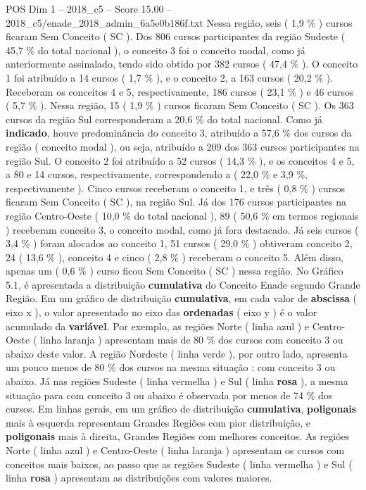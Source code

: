 \begin{textsample}{POS Dim 1 – 2018\_c5 – Score 15.00 – 2018\_c5/enade\_2018\_admin\_6a5e0b186f.txt}
Nessa região, seis ( 1,9 \% ) cursos ficaram Sem Conceito ( SC ).
Dos 806 cursos participantes da região Sudeste ( 45,7 \% do total nacional ), o conceito 3 foi o conceito modal, como já anteriormente assinalado, tendo sido obtido por 382 cursos ( 47,4 \% ).
O conceito 1 foi atribuído a 14 cursos ( 1,7 \% ), e o conceito 2, a 163 cursos ( 20,2 \% ).
Receberam os conceitos 4 e 5, respectivamente, 186 cursos ( 23,1 \% ) e 46 cursos ( 5,7 \% ).
Nessa região, 15 ( 1,9 \% ) cursos ficaram Sem Conceito ( SC ).
Os 363 cursos da região Sul corresponderam a 20,6 \% do total nacional.
Como já \textbf{indicado}, houve predominância do conceito 3, atribuído a 57,6 \% dos cursos da região ( conceito modal ), ou seja, atribuído a 209 dos 363 cursos participantes na região Sul.
O conceito 2 foi atribuído a 52 cursos ( 14,3 \% ), e os conceitos 4 e 5, a 80 e 14 cursos, respectivamente, correspondendo a ( 22,0 \% e 3,9 \%, respectivamente ).
Cinco cursos receberam o conceito 1, e três ( 0,8 \% ) cursos ficaram Sem Conceito ( SC ), na região Sul.
Já dos 176 cursos participantes na região Centro-Oeste ( 10,0 \% do total nacional ), 89 ( 50,6 \% em termos regionais ) receberam conceito 3, o conceito modal, como já fora destacado.
Já seis cursos ( 3,4 \% ) foram alocados ao conceito 1, 51 cursos ( 29,0 \% ) obtiveram conceito 2, 24 ( 13,6 \% ), conceito 4 e cinco ( 2,8 \% ) receberam o conceito 5.
Além disso, apenas um ( 0,6 \% ) curso ficou Sem Conceito ( SC ) nessa região.
No Gráfico 5.1, é apresentada a distribuição \textbf{cumulativa} do Conceito Enade segundo Grande Região.
Em um gráfico de distribuição \textbf{cumulativa}, em cada valor de \textbf{abscissa} ( eixo x ), o valor apresentado no eixo das \textbf{ordenadas} ( eixo y ) é o valor acumulado da \textbf{variável}.
Por exemplo, as regiões Norte ( linha azul ) e Centro-Oeste ( linha laranja ) apresentam mais de 80 \% dos cursos com conceito 3 ou abaixo deste valor.
A região Nordeste ( linha verde ), por outro lado, apresenta um pouco menos de 80 \% dos cursos na mesma situação : com conceito 3 ou abaixo.
Já nas regiões Sudeste ( linha vermelha ) e Sul ( linha \textbf{rosa} ), a mesma situação para com conceito 3 ou abaixo é observada por menos de 74 \% dos cursos.
Em linhas gerais, em um gráfico de distribuição \textbf{cumulativa}, \textbf{poligonais} mais à esquerda representam Grandes Regiões com pior distribuição, e \textbf{poligonais} mais à direita, Grandes Regiões com melhores conceitos.
As regiões Norte ( linha azul ) e Centro-Oeste ( linha laranja ) apresentam os cursos com conceitos mais baixos, ao passo que as regiões Sudeste ( linha vermelha ) e Sul ( linha \textbf{rosa} ) apresentam as distribuições com valores maiores.

\end{textsample}
